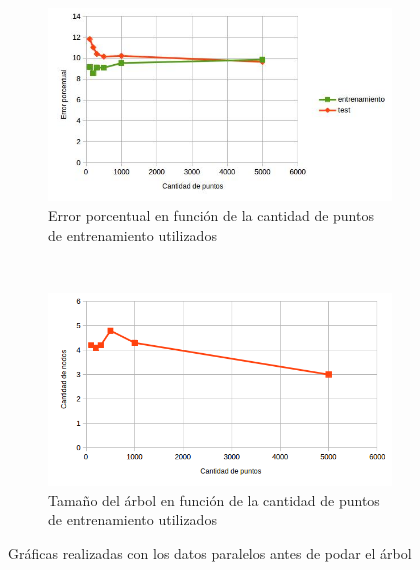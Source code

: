 \documentclass[12pt, a4paper]{article}
\begin{document}
\begin{figure}
    \centering

    \begin{subfigure}[b]{0.65\textwidth}
        \includegraphics[width=\textwidth]{errorBB}
        \caption{Error porcentual en función de la cantidad de puntos de entrenamiento utilizados}
    \end{subfigure}
      ~ %
    \begin{subfigure}[b]{0.65\textwidth}
        \includegraphics[width=\textwidth]{sizeBB}
        \caption{Tamaño del árbol en función de la cantidad de puntos de entrenamiento utilizados}
    \end{subfigure}
    \caption{Gráficas realizadas con los datos paralelos antes de podar el árbol}
\end{figure}
\end{document}
